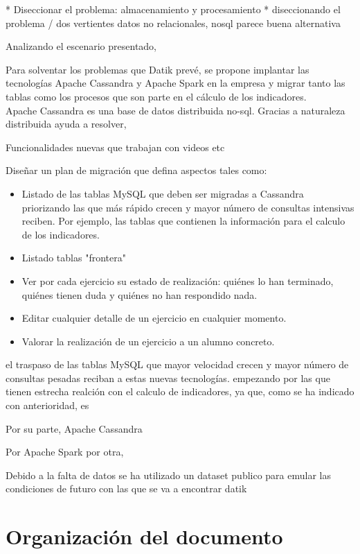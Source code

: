 * Diseccionar el problema: almacenamiento y procesamiento
* diseccionando el problema / dos vertientes
datos no relacionales, nosql parece buena alternativa

Analizando el escenario presentado, 

Para solventar los problemas que Datik prevé, se propone implantar las tecnologías Apache Cassandra y Apache Spark en la empresa y migrar tanto las tablas como los procesos que son parte en el cálculo de los indicadores.\\


Apache Cassandra es una base de datos distribuida no-sql. Gracias a naturaleza distribuida ayuda a resolver, 

Funcionalidades nuevas que trabajan con videos etc




Diseñar un plan de migración que defina aspectos tales como: 

\begin{itemize}
	\item Listado de las tablas MySQL que deben ser migradas a Cassandra priorizando las que más rápido crecen y mayor número de consultas intensivas reciben. Por ejemplo, las tablas que contienen la información para el calculo de los indicadores.
	\item Listado tablas "frontera"
	\item Ver por cada ejercicio su estado de realización: quiénes lo han terminado, quiénes tienen duda y quiénes no han respondido nada.
	\item Editar cualquier detalle de un ejercicio en cualquier momento.
	\item Valorar la realización de un ejercicio a un alumno concreto.
\end{itemize}

el traspaso de las tablas MySQL que mayor velocidad crecen  y mayor número de consultas pesadas reciban a estas nuevas tecnologías. empezando por las que tienen estrecha realción con el calculo de indicadores, ya que, como se ha indicado con anterioridad, es  

Por su parte, Apache Cassandra

Por Apache Spark por otra,

Debido a la falta de datos se ha utilizado un dataset publico para emular las condiciones de futuro con las que se va a encontrar datik

\section{Organización del documento}

